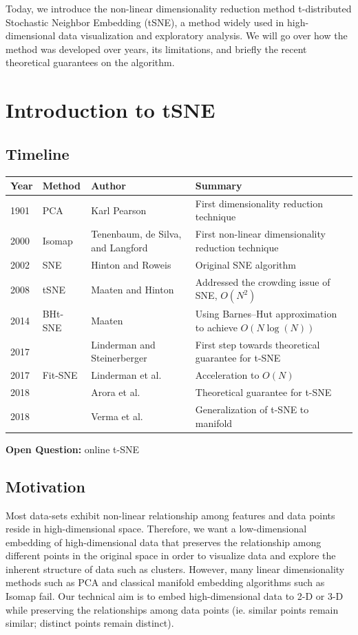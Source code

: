 Today, we introduce the non-linear dimensionality reduction method
t-distributed Stochastic Neighbor Embedding (tSNE), a method widely
used in high-dimensional data visualization and exploratory
analysis. We will go over how the method was developed over years, its
limitations, and briefly the recent theoretical guarantees on the
algorithm. 

\section{Introduction to tSNE}
\subsection{Timeline}
\begin{center}
    \begin{tabular}{ | l | l | p{5cm} | p{5cm} |}
    \hline
    \textbf{Year} & \textbf{Method} & \textbf{Author} & \textbf{Summary} \\ \hline
    1901 & PCA & Karl Pearson & First dimensionality reduction technique \\ \hline
    2000 & Isomap & Tenenbaum, de Silva, and Langford & First non-linear dimensionality reduction technique \\ \hline
    2002 & SNE & Hinton and Roweis & Original SNE algorithm \\ \hline
    2008 & tSNE & Maaten and Hinton & Addressed the crowding issue of SNE, $O(N^2)$ \\ \hline
    2014 & BHt-SNE & Maaten & Using Barnes–Hut approximation to achieve $O(N\log(N))$ \\ \hline
    2017 & & Linderman and Steinerberger & First step towards theoretical guarantee for t-SNE \\ \hline
    2017 & Fit-SNE & Linderman et al. & Acceleration to $O(N)$ \\
    \hline
    2018 & & Arora et al. & Theoretical guarantee for t-SNE \\ \hline
    2018 & & Verma et al. & Generalization of t-SNE to manifold \\ \hline
    \end{tabular}
\end{center}
\textbf{Open Question:} online t-SNE

\subsection{Motivation}
Most data-sets exhibit non-linear relationship among features and data
points reside in high-dimensional space. Therefore, we want a
low-dimensional embedding of high-dimensional data that preserves the
relationship among different points in the original space in order to
visualize data and explore the inherent structure of data such as
clusters. However, many linear dimensionality methods such as PCA and
classical manifold embedding algorithms such as Isomap fail. Our
technical aim is to embed high-dimensional data to 2-D or 3-D while
preserving the relationships among data points (ie. similar points
remain similar; distinct points remain distinct). 

